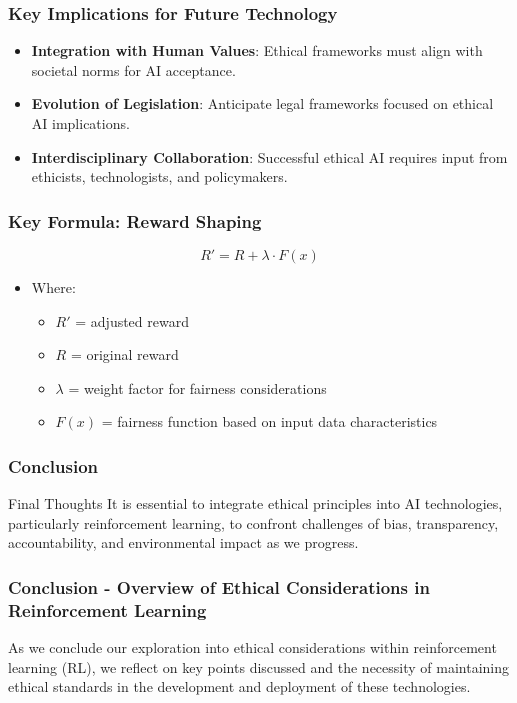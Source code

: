 \documentclass[aspectratio=169]{beamer}
\begin{document}
\begin{frame}[fragile]
    \frametitle{Key Implications for Future Technology}
    \begin{itemize}
        \item \textbf{Integration with Human Values}: Ethical frameworks must align with societal norms for AI acceptance.
        \item \textbf{Evolution of Legislation}: Anticipate legal frameworks focused on ethical AI implications.
        \item \textbf{Interdisciplinary Collaboration}: Successful ethical AI requires input from ethicists, technologists, and policymakers.
    \end{itemize}
\end{frame}

\begin{frame}[fragile]
    \frametitle{Key Formula: Reward Shaping}
    \begin{equation}
        R' = R + \lambda \cdot F(x)
    \end{equation}
    \begin{itemize}
        \item Where:
        \begin{itemize}
            \item \(R'\) = adjusted reward
            \item \(R\) = original reward
            \item \(\lambda\) = weight factor for fairness considerations
            \item \(F(x)\) = fairness function based on input data characteristics
        \end{itemize}
    \end{itemize}
\end{frame}

\begin{frame}[fragile]
    \frametitle{Conclusion}
    \begin{block}{Final Thoughts}
        It is essential to integrate ethical principles into AI technologies, particularly reinforcement learning, to confront challenges of bias, transparency, accountability, and environmental impact as we progress.
    \end{block}
\end{frame}

\begin{frame}[fragile]
    \frametitle{Conclusion - Overview of Ethical Considerations in Reinforcement Learning}
    
    As we conclude our exploration into ethical considerations within reinforcement learning (RL), we reflect on key points discussed and the necessity of maintaining ethical standards in the development and deployment of these technologies.
\end{frame}
\end{document}
